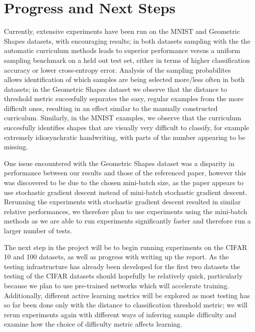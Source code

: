 \documentclass[a4paper,10pt]{article}
\begin{document}
\section{Progress and Next Steps}
Currently, extensive experiments have been run on the MNIST and Geometric Shapes datasets, with encouraging results; in both datasets sampling with the the automatic curriculum methods leads to superior performance versus a uniform sampling benchmark on a held out test set, either in terms of higher classification accuracy or lower cross-entropy error. Analysis of the sampling probabilites allows identification of which samples are being selected more/less often in both datasets;  in the Geometric Shapes dataset we observe that the distance to threshold metric succesfully separates the easy, regular examples from the more difficult ones, resulting in an effect similar to the manually constructed curriculum. Similarly, in the MNIST examples, we observe that the curriculum succesfully identifies shapes that are visually very difficult to classify, for example extremely idiosynchratic handwriting, with parts of the number appearing to be missing. 

One issue encountered with the Geometric Shapes dataset was a disparity in performance between our results and those of the referenced paper, however this was discovered to be due to the chosen mini-batch size, as the paper appears to use stochastic gradient descent instead of mini-batch stochastic gradient descent. Rerunning the experiments with stochastic gradient descent resulted in similar relative performances, we therefore plan to use experiments using the mini-batch methods as we are able to run experiments significantly faster and therefore run a larger number of tests. 

The next step in the project will be to begin running experiments on the CIFAR 10 and 100 datasets, as well as progress with writing up the report. As the testing infrastructure has already been developed for the first two datasets the testing of the CIFAR datasets should hopefully be relatively quick, particularly because we plan to use pre-trained networks which will accelerate training. Additionally, different active learning metrics will be explored as most testing has so far been done only with the distance to classification threshold metric; we will rerun experiments again with different ways of inferring sample difficulty and examine how the choice of difficulty metric affects learning.  
\end{document}
